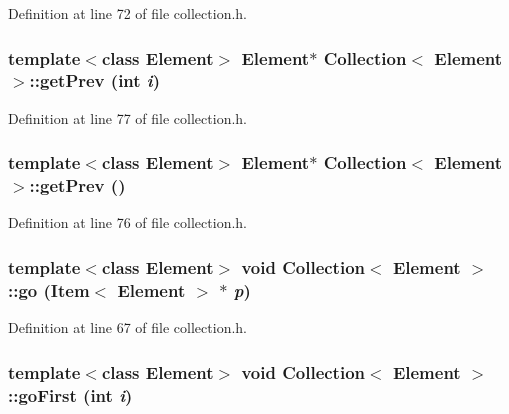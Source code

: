 Definition at line 72 of file collection.h.\hypertarget{classCollection_89c9afd1417e3cef4f4ff4cc872d3d76}{
\subsubsection[{getPrev}]{\setlength{\rightskip}{0pt plus 5cm}template$<$class Element$>$ Element$\ast$ {\bf Collection}$<$ Element $>$::getPrev (int {\em i})}}
\label{classCollection_89c9afd1417e3cef4f4ff4cc872d3d76}




Definition at line 77 of file collection.h.\hypertarget{classCollection_fd1ab2a6e64a0c928422bfac3e86070c}{
\subsubsection[{getPrev}]{\setlength{\rightskip}{0pt plus 5cm}template$<$class Element$>$ Element$\ast$ {\bf Collection}$<$ Element $>$::getPrev ()}}
\label{classCollection_fd1ab2a6e64a0c928422bfac3e86070c}




Definition at line 76 of file collection.h.\hypertarget{classCollection_9e206e3c49e72d153b52eaa808d6f5c0}{
\subsubsection[{go}]{\setlength{\rightskip}{0pt plus 5cm}template$<$class Element$>$ void {\bf Collection}$<$ Element $>$::go ({\bf Item}$<$ Element $>$ $\ast$ {\em p})}}
\label{classCollection_9e206e3c49e72d153b52eaa808d6f5c0}




Definition at line 67 of file collection.h.\hypertarget{classCollection_0ad266a9e0f7ba45615bab587dee740d}{
\subsubsection[{goFirst}]{\setlength{\rightskip}{0pt plus 5cm}template$<$class Element$>$ void {\bf Collection}$<$ Element $>$::goFirst (int {\em i})}}
\label{classCollection_0ad266a9e0f7ba45615bab587dee740d}




